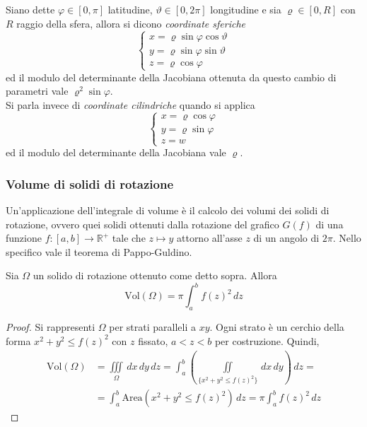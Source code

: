 Siano dette $\varphi \in [0, \pi]$ latitudine, $\vartheta \in [0, 2\pi]$ longitudine e sia $\varrho \in [0, R]$ con $R$ raggio della sfera, allora si dicono \textit{coordinate sferiche}
\begin{equation}
    \begin{cases}
    x=\varrho \sin \varphi \cos \vartheta\\
    y=\varrho \sin \varphi \sin \vartheta\\
    z=\varrho \cos \varphi
    \end{cases}
\end{equation}
ed il modulo del determinante della Jacobiana ottenuta da questo cambio di parametri vale $\varrho^2 \sin \varphi$.\\
Si parla invece di \textit{coordinate cilindriche} quando si applica
\begin{equation}
    \begin{cases}
        x=\varrho \cos \varphi\\
        y=\varrho \sin \varphi\\
        z=w
    \end{cases}
\end{equation}
ed il modulo del determinante della Jacobiana vale $\varrho$.
\subsubsection{Volume di solidi di rotazione}
Un'applicazione dell'integrale di volume è il calcolo dei volumi dei solidi di rotazione, ovvero quei solidi ottenuti dalla rotazione del grafico $G(f)$ di una funzione $f:[a,b] \to \mathbb{R}^+$ tale che $z \mapsto y$ attorno all'asse $z$ di un angolo di $2\pi$. Nello specifico vale il teorema di Pappo-Guldino.
\begin{theorem}
Sia $\Omega$ un solido di rotazione ottenuto come detto sopra. Allora
\begin{equation}
    \text{Vol}(\Omega)= \pi \int_a^b{f(z)^2}\, dz
\end{equation}
\end{theorem}
\begin{proof}
    Si rappresenti $\Omega$ per strati paralleli a $xy$. Ogni strato è un cerchio della forma $x^2+y^2 \leq f(z)^2$ con $z$ fissato, $a<z<b$ per costruzione.
    Quindi, 
    \begin{equation}
    \begin{aligned}
        \text{Vol}(\Omega)&= \iiint\limits_{\Omega}\,dx\,dy\,dz=\int_a^b{\left(\iint\limits_{\{x^2+y^2 \leq f(z)^2\}}{\,dx\,dy}\right)}\,dz=\\
        &= \int_{a}^{b}{\text{Area}(x^2+y^2 \leq f(z)^2)}\,dz = \pi\int_a^b{f(z)^2}\,dz
    \end{aligned}
    \end{equation}
\end{proof}
